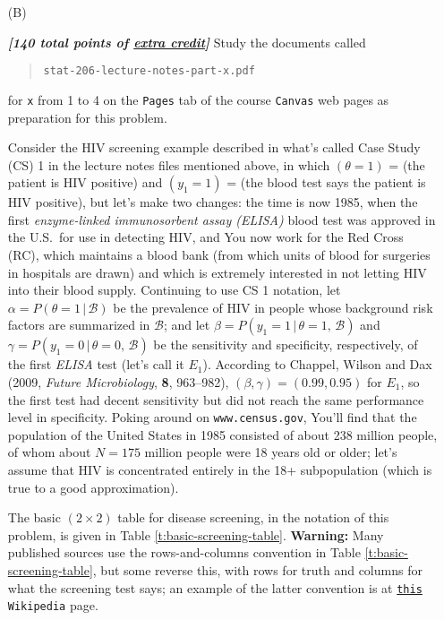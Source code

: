 \documentclass[12pt]{article}
\newcommand{\given}{\, | \,}
\newcommand{\bi}[1]{\b{\i{#1}}}
\renewcommand{\b}[1]{\textbf{#1}}
\renewcommand{\i}[1]{\textit{#1}}
\renewcommand{\t}[1]{\texttt{#1}}
\renewcommand{\u}[1]{\underline{#1}}
\begin{document}
\begin{itemize}
\begin{itemize}
\begin{itemize}
\begin{itemize}
\end{itemize}

\end{itemize}

\end{itemize}

\item[(B)]

\bi{[140 total points of \u{extra credit}]} Study the documents called 

\begin{quote}

\t{stat-206-lecture-notes-part-x.pdf} 

\end{quote}

for \t{x} from 1 to 4 on the \t{Pages} tab of the course \t{Canvas} web pages as preparation for this problem.

Consider the HIV screening example described in what's called Case Study (CS) 1 in the lecture notes files mentioned above, in which $( \theta = 1 )$ = (the patient is HIV positive) and $( y_1 = 1 )$ = (the blood test says the patient is HIV positive), but let's make two changes: the time is now 1985, when the first \textit{enzyme-linked immunosorbent assay (ELISA)} blood test was approved in the U.S.~for use in detecting HIV, and You now work for the Red Cross (RC), which maintains a blood bank (from which units of blood for surgeries in hospitals are drawn) and which is extremely interested in not letting HIV into their blood supply. Continuing to use CS 1 notation, let $\alpha = P ( \theta = 1 \given \mathcal{ B } )$ be the prevalence of HIV in people whose background risk factors are summarized in $\mathcal{ B }$; and let $\beta = P ( y_1 = 1 \given \theta = 1 , \, \mathcal{ B } )$ and $\gamma = P ( y_1 = 0 \given \theta = 0 , \, \mathcal{ B })$ be the sensitivity and specificity, respectively, of the first \textit{ELISA} test (let's call it $E_1$). According to Chappel, Wilson and Dax (2009, \textit{Future Microbiology}, \textbf{8}, 963--982), $( \beta, \gamma ) = ( 0.99, 0.95 )$ for $E_1$, so the first test had decent sensitivity but did not reach the same performance level in specificity. Poking around on \texttt{www.census.gov}, You'll find that the population of the United States in 1985 consisted of about 238 million people, of whom about $N = 175$ million people were 18 years old or older; let's assume that HIV is concentrated entirely in the 18+ subpopulation (which is true to a good approximation). 

The basic $( 2 \times 2 )$ table for disease screening, in the notation of this problem, is given in Table \ref{t:basic-screening-table}. \textbf{Warning:} Many published sources use the rows-and-columns convention in Table \ref{t:basic-screening-table}, but some reverse this, with rows for truth and columns for what the screening test says; an example of the latter convention is at 
\href{https://en.wikipedia.org/wiki/Sensitivity\_and\_specificity}{\t{this}}
\t{Wikipedia} page.


\end{itemize}
\end{document}
